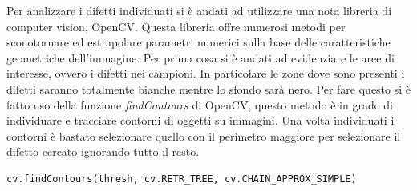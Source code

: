\documentclass[12pt,a4paper,openright,twoside]{report}
\begin{document}
Per analizzare i difetti individuati si è andati ad utilizzare una nota libreria di computer vision, OpenCV. Questa libreria offre numerosi metodi per sconotornare ed estrapolare parametri numerici sulla base delle caratteristiche geometriche dell'immagine. 
Per prima cosa si è andati ad evidenziare le aree di interesse, ovvero i difetti nei campioni. In particolare le zone dove sono presenti i difetti saranno totalmente bianche mentre lo sfondo sarà nero. 
Per fare questo si è fatto uso della funzione \emph{findContours} di OpenCV, questo metodo è in grado di individuare e tracciare contorni di oggetti su immagini.
Una volta individuati i contorni è bastato selezionare quello con il perimetro maggiore per selezionare il difetto cercato ignorando tutto il resto. 
\begin{verbatim}
cv.findContours(thresh, cv.RETR_TREE, cv.CHAIN_APPROX_SIMPLE)    
\end{verbatim}
\end{document}
